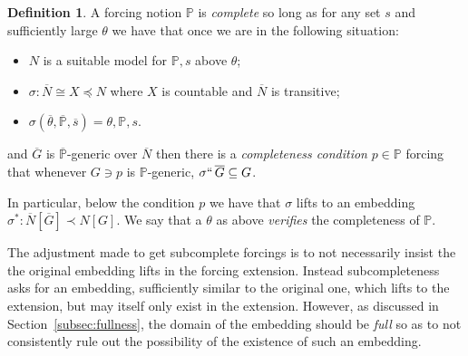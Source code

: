 \documentclass{amsart}
\theoremstyle{definition}
\newtheorem{definition}[theorem]{Definition}
\theoremstyle{remark}
\renewcommand{\P}{\mathbb{P}}
\newcommand{\N}{{\overline{N}}}
\newcommand{\G}{\overline{G}}
\begin{document}
 
\begin{definition} A forcing notion $\P$ is \emph{complete} so long as
for any set $s$ and sufficiently large $\theta$ we have that once we are in the following situation: \begin{itemize}
	\item $N$ is a suitable model for $\P,s$ above $\theta$;
	\item $\sigma: \N \cong X \preccurlyeq N$ where $X$ is countable and $\N$ is transitive;
	\item $\sigma(\overline \theta, \overline{\P}, \overline s)=\theta, \P, s$.
\end{itemize}
and $\G$ is $\overline{\P}$-generic over $\N$ then there is a \emph{completeness condition} $p \in \P$ forcing that whenever $G \ni p$ is $\P$-generic, $\sigma ``\, \G \subseteq G$. 

In particular, below the condition $p$ we have that $\sigma$ lifts to an embedding $\sigma^*:\N[\G] \prec N[G]$.
We say that a $\theta$ as above \emph{verifies} the completeness of $\P$.
\end{definition}
The adjustment made to get subcomplete forcings is to not necessarily insist the the original embedding lifts in the forcing extension. Instead subcompleteness asks for an embedding, sufficiently similar
to the original one, which lifts to the extension, but may itself only exist in the extension.
However, as discussed in Section~\ref{subsec:fullness}, the domain of the embedding should be \emph{full} so as to not consistently rule out the possibility of the existence of such an embedding. 
\end{document}
